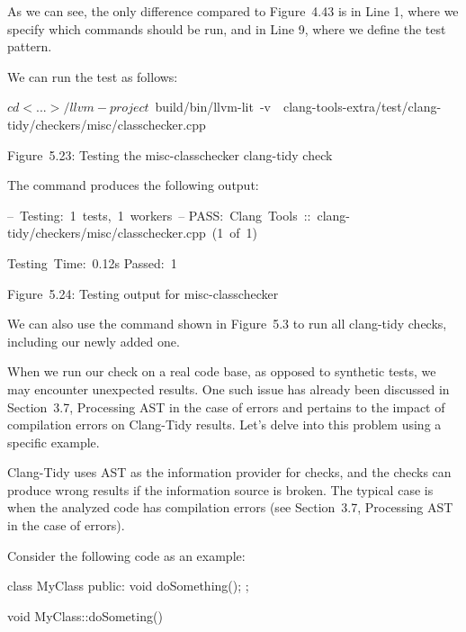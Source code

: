 As we can see, the only difference compared to Figure 4.43 is in Line 1, where we specify which commands should be run, and in Line 9, where we define the test pattern.

We can run the test as follows:

\begin{shell}
$ cd <...>/llvm-project
$ build/bin/llvm-lit -v \
clang-tools-extra/test/clang-tidy/checkers/misc/classchecker.cpp
\end{shell}

\begin{center}
Figure 5.23: Testing the misc-classchecker clang-tidy check
\end{center}

The command produces the following output:

\begin{shell}
-- Testing: 1 tests, 1 workers --
PASS: Clang Tools :: clang-tidy/checkers/misc/classchecker.cpp (1 of 1)

Testing Time: 0.12s
  Passed: 1
\end{shell}

\begin{center}
Figure 5.24: Testing output for misc-classchecker
\end{center}

We can also use the command shown in Figure 5.3 to run all clang-tidy checks, including our newly added one.

When we run our check on a real code base, as opposed to synthetic tests, we may encounter unexpected results. One such issue has already been discussed in Section 3.7, Processing AST in the case of errors and pertains to the impact of compilation errors on Clang-Tidy results. Let's delve into this problem using a specific example.


Clang-Tidy uses AST as the information provider for checks, and the checks can produce wrong results if the information source is broken. The typical case is when the analyzed code has compilation errors (see Section 3.7, Processing AST in the case of errors).

Consider the following code as an example:

\begin{cpp}
class MyClass {
public:
  void doSomething();
};

void MyClass::doSometing() {}
\end{cpp}


